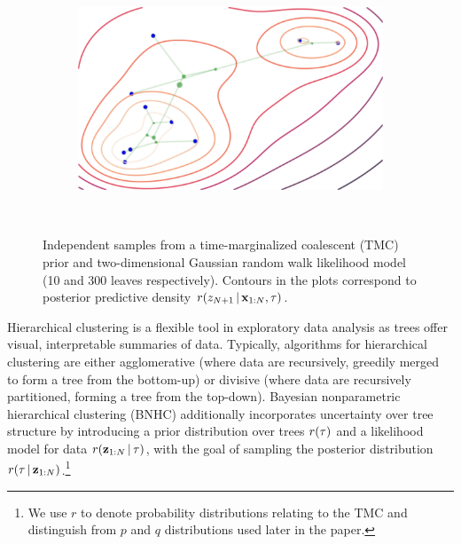 \begin{figure}[t]
\centering
\begin{subfigure}[t]{0.4\textwidth}
    \centering
    \includegraphics[frame, width=\textwidth]{img/loracs/tmc/tmc-small-cropped}
\end{subfigure}
~
\begin{subfigure}[t]{0.4\textwidth}
    \centering
\end{subfigure}
\caption{Independent samples from a time-marginalized coalescent (TMC) prior and two-dimensional Gaussian random walk likelihood model (10 and 300 leaves respectively). 
Contours in the plots correspond to posterior predictive density $r(z_{N + 1} \,|\, \mathbf{x}_{1:N}, \tau)$.}
\label{fig:tmc-samples}
\end{figure}

Hierarchical clustering is a flexible
tool in exploratory data analysis
as trees offer visual, interpretable
summaries of data. Typically,
algorithms for hierarchical clustering are
either agglomerative
(where data are recursively, greedily merged to form
a tree from the bottom-up)
or divisive (where data
are recursively partitioned, forming a tree from the
top-down). Bayesian nonparametric hierarchical clustering (BNHC) 
additionally incorporates uncertainty over tree
structure by introducing
a prior distribution over trees $r(\tau)$ and
a likelihood model for data $r(\mathbf{z}_{1:N} \,|\, \tau)$,
with the goal of sampling
the posterior distribution $r(\tau \,|\, \mathbf{z}_{1:N})$.\footnote{We use $r$ to denote probability distributions
relating to the TMC and distinguish from $p$ and $q$
distributions used later in the paper.}

